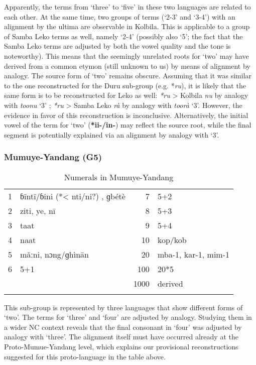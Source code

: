 Apparently, the terms from ‘three’ to ‘five’ in these two languages are related to each other. At the same time, two groups of terms (‘2-3’ and ‘3-4’) with an alignment by the ultima are observable in Kolbila. This is applicable to a group of Samba Leko terms as well, namely ‘2-4’ (possibly also ‘5’; the fact that the Samba Leko terms are adjusted by both the vowel quality and the tone is noteworthy). This means that the seemingly unrelated roots for ‘two’ may have derived from a common etymon (still unknown to us) by means of alignment by analogy. The source form of ‘two’ remains obscure. Assuming that it was similar to the one reconstructed for the Duru sub-group (e.g. *\textit{ru}), it is likely that the same form is to be reconstructed for Leko as well: \textit{*ru} > Kolbila \textit{nu} by analogy with \textit{toonu} ‘3’ ; \textit{*ru} > Samba Leko \textit{rà} by analogy with \textit{toorà} ‘3’. However, the evidence in favor of this reconstruction is inconclusive. Alternatively, the initial vowel of the term for ‘two’ (\textbf{*ii-/in-}) may reflect the source root, while the final segment is potentially explained via an alignment by analogy with `3'.

\subsubsection{Mumuye-Yandang (G5)}%
\begin{table}
\caption{\label{tab:3:108}Numerals in Mumuye-Yandang}


\begin{tabularx}{\textwidth}{lQrQ}
\lsptoprule

1 & ɓ{\={i}}nt{\={i}}/ɓini (*< nti/ni?) , ɡbétè & 7 & 5+2\\
2 & ziti, ye, n{\={i}} & 8 & 5+3\\
3 & taat & 9 & 5+4\\
4 & naat & 10 & kop/kob\\
5 & m{\v{a}}ːni, nɔng/ɡhìn{\={a}}n & 20 & mba-1, kar-1, mim-1\\
6 & 5+1 & 100 & 20*5\\
&  & 1000 & derived\\
\lspbottomrule
\end{tabularx}
\end{table}

This sub-group is represented by three languages that show different forms of ‘two’. The terms for ‘three’ and ‘four’ are adjusted by analogy. Studying them in a wider NC context reveals that the final consonant in ‘four’ was adjusted by analogy with ‘three’. The alignment itself must have occurred already at the Proto-Mumue-Yandang level, which explains our provisional reconstructions suggested for this proto-language in the table above.

